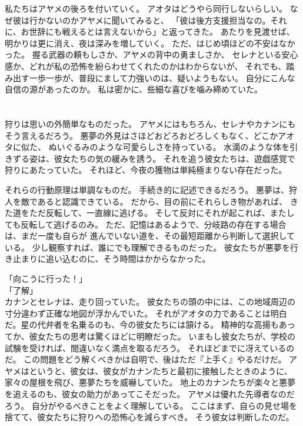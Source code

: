 \documentclass[../IHMain]{subfiles}
\begin{document}
私たちはアヤメの後ろを付いていく。
アオタはどうやら同行しないらしい。
なぜ彼は行かないのかアヤメに聞いてみると、
「彼は後方支援担当なの。それに、お世辞にも戦えるとは言えないから」と返ってきた。
あたりを見渡せば、明かりは更に消え、夜は深みを増していく。
ただ、はじめ頃ほどの不安はなかった。
握る武器の頼もしさか、アヤメの背中の勇ましさか、
セレナといる安心感か、どれが私の恐怖を紛らわせてくれたのかはわからないが、
それでも、踏み出す一歩一歩が、普段にまして力強いのは、疑いようもない。
自分にこんな自信の源があったのか。
私は密かに、些細な喜びを噛み締めていた。

\section{}
狩りは思いの外簡単なものだった。
アヤメにはもちろん、セレナやカナンにもそう言えるだろう。
悪夢の外見はさほどおどろおどろしくもなく、どこかアオタに似た、
ぬいぐるみのような可愛らしさを持っている。
水滴のような体を引きずる姿は、彼女たちの気の緩みを誘う。
それを追う彼女たちは、遊戯感覚で狩りにあたっていた。
それほど、今夜の獲物は単純極まりない存在だった。

それらの行動原理は単調なものだ。
手続き的に記述できるだろう。
悪夢は、狩人を敵であると認識できている。
だから、目の前にそれらしき物があれば、
きた道をただ反転して、一直線に逃げる。
そして反対にそれが起これば、またしても反転して逃げるのみ。
ただ、記憶はあるようで、分岐路の存在する場合は、まだ一度も自らが
進んでいない道を、その最短距離から判断して選択している。
少し観察すれば、誰にでも理解できるものだった。
彼女たちが悪夢を行き止まりに追い込むのに、そう時間はかからなかった。

「向こうに行った！」\\
「了解」\\
カナンとセレナは、走り回っていた。
彼女たちの頭の中には、この地域周辺の寸分違わず正確な地図が浮かんでいた。
それがアオタの力であることは明白だ。星の代弁者を名乗るのも、今の彼女たちには頷ける。
精神的な高揚もあってか、彼女たちの思考は驚くほどに明瞭だった。
いまもし彼女たちが、学校の試験を受ければ、間違いなく満点を取るだろう。
それほどまでに冴えているのだ。
この問題をどう解くべきかは自明で、後はただ『上手く』やるだけだ。
アヤメはというと、彼女は、彼女がカナンたちと最初に接触したときのように、
家々の屋根を飛び、悪夢たちを威嚇していた。
地上のカナンたちが楽々と悪夢を追えるのも、彼女の助力があってこそだった。
アヤメは優れた先導者なのだろう。
自分がやるべきことをよく理解している。
ここはまず、自らの見せ場を捨てて、彼女たちに狩りへの恐怖心を減らすべき。
そう彼女は判断したのだ。
\end{document}
